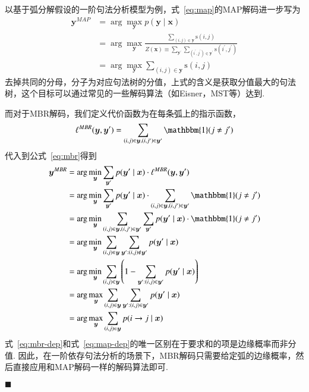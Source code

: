 以基于弧分解假设的一阶句法分析模型为例，式~\ref{eq:map}的MAP解码进一步写为
\begin{equation}
    \label{eq:map-dep}
    \begin{split}
        \boldsymbol{y}^{MAP}&=\arg\max_{\boldsymbol{y}}p(\boldsymbol{y}\mid\boldsymbol{x})\\
        &=\arg\max_{\boldsymbol{y}}\frac{\sum_{(i,j)\in \boldsymbol{y}}\mathrm{s}(i,j)}{Z(\boldsymbol{x})\equiv \sum_{\boldsymbol{y}^{\prime}}\sum_{(i^{\prime},j^{\prime})\in \boldsymbol{y}^{\prime}}\mathrm{s}(i^{\prime},j^{\prime})}\\
        &=\arg\max_{\boldsymbol{y}}\sum_{(i,j)\in \boldsymbol{y}}\mathrm{s}(i,j)
    \end{split}
\end{equation}
去掉共同的分母，分子为对应句法树的分值，上式的含义是获取分值最大的句法树，这个目标可以通过常见的一些解码算法（如Eisner，MST等）达到.

而对于MBR解码，我们定义代价函数为在每条弧上的指示函数，
\begin{equation}
    \ell^{MBR}(\boldsymbol{y},\boldsymbol{y}^{\prime}) = \sum_{(i,j)\in\boldsymbol{y},(i,j^{\prime})\in\boldsymbol{y}^{\prime}}\mathbbm{1}(j\neq j^{\prime})
\end{equation}
代入到公式~\ref{eq:mbr}得到
\begin{equation}
    \label{eq:mbr-dep}
    \begin{split}
        \boldsymbol{y}^{MBR}&= \arg\min_{\boldsymbol{y}}\sum_{\boldsymbol{y}^{\prime}}p(\boldsymbol{y}^{\prime}\mid\boldsymbol{x})\cdot\ell^{MBR}(\boldsymbol{y},\boldsymbol{y}^{\prime})\\
        &=\arg\min_{\boldsymbol{y}}\sum_{\boldsymbol{y}^{\prime}}p(\boldsymbol{y}^{\prime}\mid\boldsymbol{x})\cdot\sum_{(i,j)\in\boldsymbol{y},(i,j^{\prime})\in\boldsymbol{y}^{\prime}}\mathbbm{1}(j\neq j^{\prime})\\
        &=\arg\min_{\boldsymbol{y}}\sum_{(i,j)\in\boldsymbol{y},(i,j^{\prime})\in\boldsymbol{y}^{\prime}}\sum_{\boldsymbol{y}^{\prime}}p(\boldsymbol{y}^{\prime}\mid\boldsymbol{x})\cdot\mathbbm{1}(j\neq j^{\prime})\\
        &=\arg\min_{\boldsymbol{y}}\sum_{(i,j)\in\boldsymbol{y}}\sum_{\boldsymbol{y}^{\prime}:(i,j)\notin \boldsymbol{y}^{\prime}}p(\boldsymbol{y}^{\prime}\mid\boldsymbol{x})\\
        &=\arg\min_{\boldsymbol{y}}\sum_{(i,j)\in\boldsymbol{y}}\left(1-\sum_{\boldsymbol{y}^{\prime}:(i,j)\in \boldsymbol{y}^{\prime}}p(\boldsymbol{y}^{\prime}\mid\boldsymbol{x})\right)\\
        &=\arg\max_{\boldsymbol{y}}\sum_{(i,j)\in\boldsymbol{y}}\sum_{\boldsymbol{y}^{\prime}:(i,j)\in \boldsymbol{y}^{\prime}}p(\boldsymbol{y}^{\prime}\mid\boldsymbol{x})\\
        &=\arg\max_{\boldsymbol{y}}\sum_{(i,j)\in\boldsymbol{y}}p(i\rightarrow j\mid\boldsymbol{x})
    \end{split}
\end{equation}
式~\ref{eq:mbr-dep}和式~\ref{eq:map-dep}的唯一区别在于要求和的项是边缘概率而非分值.
因此，在一阶依存句法分析的场景下，MBR解码只需要给定弧的边缘概率，然后直接应用和MAP解码一样的解码算法即可\cite{smith-smith-2007-probabilistic, smith-2011-linguistic}.

\noindent$\blacksquare$

